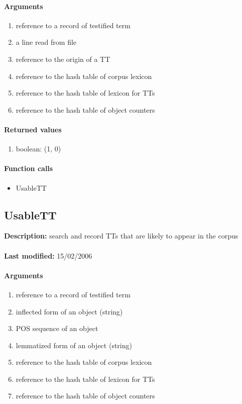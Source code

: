 \paragraph{Arguments}
\begin{enumerate}
\item reference to a record of testified term
\item a line read from file
\item reference to the origin of a TT
\item reference to the hash table of corpus lexicon
\item reference to the hash table of lexicon for TTs
\item reference to the hash table of object counters
\end{enumerate}

\paragraph{Returned values}
\begin{enumerate}
\item boolean: (1, 0)
\end{enumerate}

\paragraph{Function calls}
\begin{itemize}
\item UsableTT
\end{itemize}

\subsection{UsableTT}
\textbf{Description:} search and record TTs that are likely to appear in the corpus\\
\\\textbf{Last modified:} 15/02/2006

\paragraph{Arguments}
\begin{enumerate}
\item reference to a record of testified term
\item inflected form of an object (string)
\item POS sequence of an object
\item lemmatized form of an object (string)
\item reference to the hash table of corpus lexicon
\item reference to the hash table of lexicon for TTs
\item reference to the hash table of object counters
\end{enumerate}

